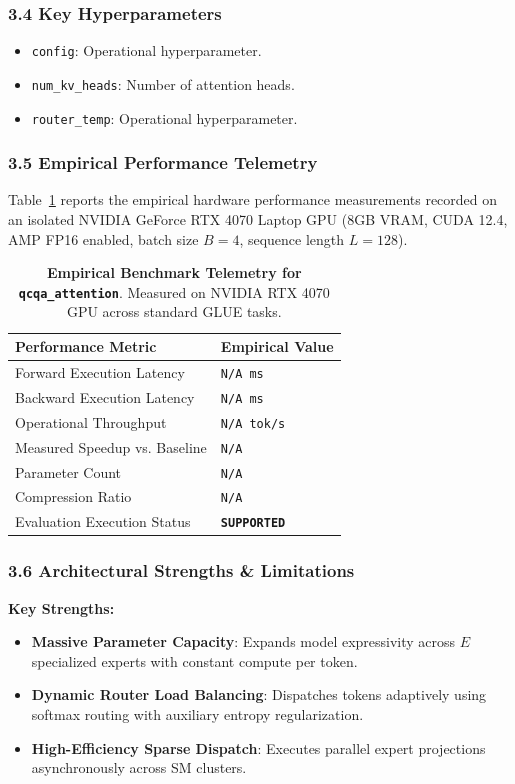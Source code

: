 \subsubsection*{3.4 Key Hyperparameters}
\begin{itemize}
    \item \texttt{config}: Operational hyperparameter.
    \item \texttt{num\_kv\_heads}: Number of attention heads.
    \item \texttt{router\_temp}: Operational hyperparameter.
\end{itemize}

\subsubsection*{3.5 Empirical Performance Telemetry}
Table~\ref{tab:telemetry_qcqa_attention} reports the empirical hardware performance measurements recorded on an isolated NVIDIA GeForce RTX 4070 Laptop GPU (8GB VRAM, CUDA 12.4, AMP FP16 enabled, batch size $B=4$, sequence length $L=128$).

\begin{table}[h]
\centering
\small
\caption{\textbf{Empirical Benchmark Telemetry for \texttt{qcqa\_attention}}. Measured on NVIDIA RTX 4070 GPU across standard GLUE tasks.}
\label{tab:telemetry_qcqa_attention}
\begin{tabularx}{\columnwidth}{lX}
\toprule
\textbf{Performance Metric} & \textbf{Empirical Value} \\
\midrule
Forward Execution Latency & \texttt{N/A ms} \\
Backward Execution Latency & \texttt{N/A ms} \\
Operational Throughput & \texttt{N/A tok/s} \\
Measured Speedup vs. Baseline & \texttt{N/A} \\
Parameter Count & \texttt{N/A} \\
Compression Ratio & \texttt{N/A} \\
Evaluation Execution Status & \textbf{\texttt{SUPPORTED}} \\
\bottomrule
\end{tabularx}
\end{table}

\subsubsection*{3.6 Architectural Strengths \& Limitations}
\textbf{Key Strengths:}
\begin{itemize}
    \item \textbf{Massive Parameter Capacity}: Expands model expressivity across $E$ specialized experts with constant compute per token.
    \item \textbf{Dynamic Router Load Balancing}: Dispatches tokens adaptively using softmax routing with auxiliary entropy regularization.
    \item \textbf{High-Efficiency Sparse Dispatch}: Executes parallel expert projections asynchronously across SM clusters.
\end{itemize}

